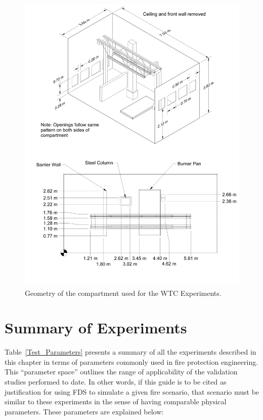 \begin{figure}[p]
\begin{center}
\includegraphics[width=6.5in]{FIGURES/WTC/WTC_Drawing}
\end{center}
\caption[Geometry of the WTC Experiments]{Geometry of the compartment used for the WTC Experiments.}
\label{WTC_Drawing}
\end{figure}


\section{Summary of Experiments}

\label{experiment_summary}

Table~\ref{Test_Parameters} presents a summary of all the experiments described in this chapter in terms of parameters commonly used in fire protection engineering. This ``parameter space'' outlines the range of applicability of the validation studies performed to date. In other words, if this guide is to be cited as justification for using FDS to simulate a given fire scenario, that scenario must be similar to these experiments in the sense of having comparable physical parameters. These parameters are explained below:

